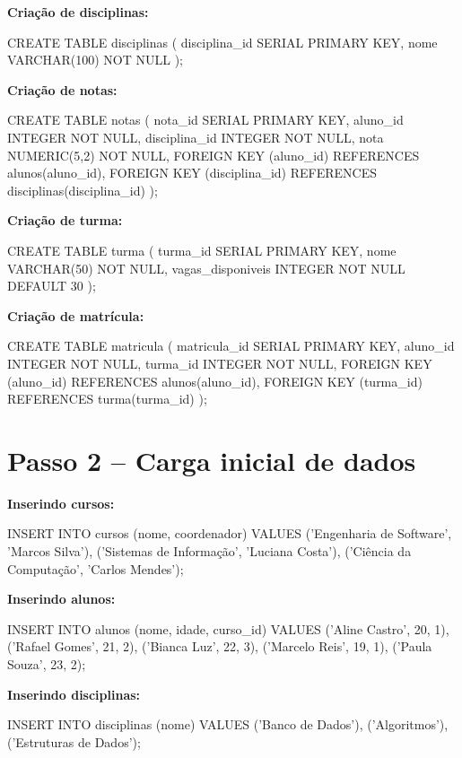 \textbf{Criação de disciplinas:}
\begin{sqlcode}
CREATE TABLE disciplinas (
    disciplina_id SERIAL PRIMARY KEY,
    nome VARCHAR(100) NOT NULL
);
\end{sqlcode}

\textbf{Criação de notas:}
\begin{sqlcode}
CREATE TABLE notas (
    nota_id SERIAL PRIMARY KEY,
    aluno_id INTEGER NOT NULL,
    disciplina_id INTEGER NOT NULL,
    nota NUMERIC(5,2) NOT NULL,
    FOREIGN KEY (aluno_id) REFERENCES alunos(aluno_id),
    FOREIGN KEY (disciplina_id) REFERENCES disciplinas(disciplina_id)
);
\end{sqlcode}

\textbf{Criação de turma:}
\begin{sqlcode}
CREATE TABLE turma (
    turma_id SERIAL PRIMARY KEY,
    nome VARCHAR(50) NOT NULL,
    vagas_disponiveis INTEGER NOT NULL DEFAULT 30
);
\end{sqlcode}

\textbf{Criação de matrícula:}
\begin{sqlcode}
CREATE TABLE matricula (
    matricula_id SERIAL PRIMARY KEY,
    aluno_id INTEGER NOT NULL,
    turma_id INTEGER NOT NULL,
    FOREIGN KEY (aluno_id) REFERENCES alunos(aluno_id),
    FOREIGN KEY (turma_id) REFERENCES turma(turma_id)
);
\end{sqlcode}

\section{Passo 2 -- Carga inicial de dados}

\textbf{Inserindo cursos:}
\begin{sqlcode}
INSERT INTO cursos (nome, coordenador) VALUES
('Engenharia de Software', 'Marcos Silva'),
('Sistemas de Informação', 'Luciana Costa'),
('Ciência da Computação', 'Carlos Mendes');
\end{sqlcode}

\textbf{Inserindo alunos:}
\begin{sqlcode}
INSERT INTO alunos (nome, idade, curso_id) VALUES
('Aline Castro', 20, 1),
('Rafael Gomes', 21, 2),
('Bianca Luz', 22, 3),
('Marcelo Reis', 19, 1),
('Paula Souza', 23, 2);
\end{sqlcode}

\textbf{Inserindo disciplinas:}
\begin{sqlcode}
INSERT INTO disciplinas (nome) VALUES
('Banco de Dados'),
('Algoritmos'),
('Estruturas de Dados');
\end{sqlcode}

